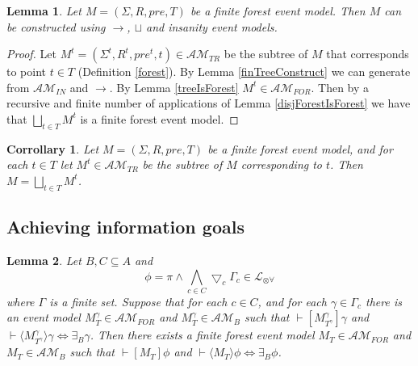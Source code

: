\documentclass[12pt, a4paper, titlepage]{scrartcl}
\newtheorem{lemma}{Lemma}[subsection]
\newtheorem{corr}{Corrollary}[subsection]
\numberwithin{equation}{section}
\newcommand{\cover}{\bigtriangledown}
\newcommand{\sqex}[1]{[{#1}]}
\newcommand{\anex}[1]{\langle {#1} \rangle}
\newcommand{\lang}{\mathcal{L}}
\newcommand{\langArbAct}{\lang_{\otimes\forall}}
\newcommand{\eventClass}{\mathcal{AM}}
\newcommand{\insaneClass}{\eventClass_{IN}}
\newcommand{\treeClass}{\eventClass_{TR}}
\newcommand{\forestClass}{\eventClass_{FOR}}
\newcommand{\FIXME}{{\bf FIXME}}
\begin{document}
\begin{lemma} \label{forestCon}
Let $M = (\Sigma, R, pre, T)$ be a finite forest event model.
Then $M$ can be constructed using $\to$, $\sqcup$ and insanity event models.
\end{lemma}

\begin{proof}
Let $M^t = (\Sigma^t, R^t, pre^t, t) \in \treeClass$ be the
subtree of $M$ that corresponds to point $t \in T$ (Definition \ref{forest}).
By Lemma \ref{finTreeConstruct} we can generate from $\insaneClass$ and $\to$.
By Lemma \ref{treeIsForest} $M^t \in \forestClass$.
Then by a recursive and finite number of applications of Lemma
\ref{disjForestIsForest} we have that $\bigsqcup_{t \in T} M^t$ is a finite
forest event model.
\end{proof}

\begin{corr} \label{forestConCorr}
Let $M = (\Sigma, R, pre, T)$ be a finite forest event model, and for each $t \in T$ let $M^t \in
\treeClass$ be the subtree of $M$ corresponding to $t$.
Then $M = \bigsqcup_{t \in T} M^t$.
\end{corr}

\subsection{Achieving information goals}


\begin{lemma} \label{coverFormulaAchievementK}
Let $B, C \subseteq A$ and
\[
\phi = \pi \land \bigwedge_{c \in C} \cover_c \Gamma_c \in \langArbAct
\]
where $\Gamma$ is a finite set.
Suppose that for each $c \in C$, and for each $\gamma \in \Gamma_c$ there is an event model
$M^\gamma_T \in \forestClass$ and $M^\gamma_T \in \eventClass_B$  such that
$\vdash \sqex{M^\gamma_{T^\gamma}} \gamma$ and $\vdash \anex{ M^\gamma_{T^\gamma} } \gamma \iff
\exists_B \gamma$.
Then there exists a finite forest event model $M_T \in \forestClass$ and $M_T \in \eventClass_B$
such that $\vdash \sqex{M_T}\phi$ and $\vdash \anex{ M_T } \phi \iff \exists_B \phi$.
\end{lemma}
\end{document}
